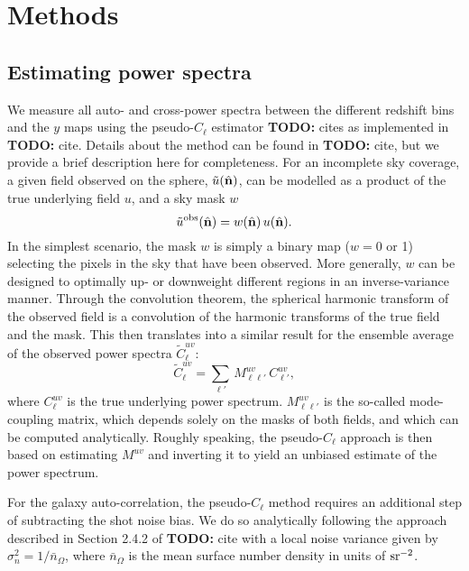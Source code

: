 \documentclass[useAMS,usenatbib]{mn2e}
\newcommand{\nv}{\hat{\bf n}}
\newcommand{\TODO}[1]{{\bf TODO:} #1}
\begin{document}
\section{Methods}\label{sec:methods}
  \subsection{Estimating power spectra}\label{ssec:methods.cls}
    We measure all auto- and cross-power spectra between the different redshift bins and the $y$ maps using the pseudo-$C_\ell$ estimator \TODO{cites} as implemented in \TODO{cite}. Details about the method can be found in \TODO{cite}, but we provide a brief description here for completeness. For an incomplete sky coverage, a given field observed on the sphere, $\tilde{u}(\nv)$, can be modelled as a product of the true underlying field $u$, and a sky mask $w$
    \begin{equation}
      \tilde{u}^{\rm obs}(\nv) = w(\nv)\,u(\nv).
    \end{equation}
    In the simplest scenario, the mask $w$ is simply a binary map ($w=0$ or 1) selecting the pixels in the sky that have been observed. More generally, $w$ can be designed to optimally up- or downweight different regions in an inverse-variance manner. Through the convolution theorem, the spherical harmonic transform of the observed field is a convolution of the harmonic transforms of the true field and the mask. This then translates into a similar result for the ensemble average of the observed power spectra $\tilde{C}^{uv}_\ell$:
    \begin{equation}
      \tilde{C}^{uv}_\ell = \sum_{\ell'}\,M^{uv}_{\ell \ell'}\, C^{uv}_{\ell'},
    \end{equation}
    where $C^{uv}_\ell$ is the true underlying power spectrum. $M^{uv}_{\ell \ell'}$ is the so-called mode-coupling matrix, which depends solely on the masks of both fields, and which can be computed analytically. Roughly speaking, the pseudo-$C_\ell$ approach is then based on estimating $M^{uv}$ and inverting it to yield an unbiased estimate of the power spectrum.
    
    For the galaxy auto-correlation, the pseudo-$C_\ell$ method requires an additional step of subtracting the shot noise bias. We do so analytically following the approach described in Section 2.4.2 of \TODO{cite} with a local noise variance given by $\sigma_n^2=1/\bar{n}_\Omega$, where $\bar{n}_\Omega$ is the mean surface number density in units of ${\rm sr}^{-2}$.
\end{document}
